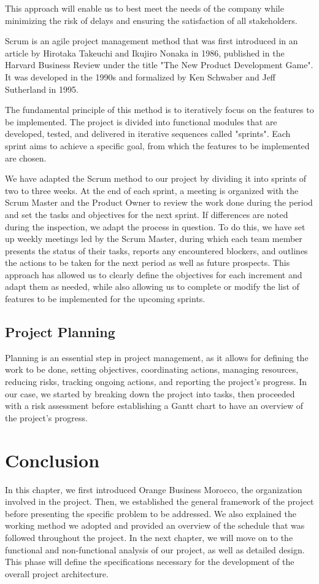 This approach will enable us to best meet the needs of the company while minimizing the risk of delays and ensuring the satisfaction of all stakeholders.

Scrum is an agile project management method that was first introduced in an article by Hirotaka Takeuchi and Ikujiro Nonaka in 1986, published in the Harvard Business Review under the title "The New Product Development Game". It was developed in the 1990s and formalized by Ken Schwaber and Jeff Sutherland in 1995.

The fundamental principle of this method is to iteratively focus on the features to be implemented. The project is divided into functional modules that are developed, tested, and delivered in iterative sequences called "sprints". Each sprint aims to achieve a specific goal, from which the features to be implemented are chosen.

We have adapted the Scrum method to our project by dividing it into sprints of two to three weeks. At the end of each sprint, a meeting is organized with the Scrum Master and the Product Owner to review the work done during the period and set the tasks and objectives for the next sprint. If differences are noted during the inspection, we adapt the process in question. To do this, we have set up weekly meetings led by the Scrum Master, during which each team member presents the status of their tasks, reports any encountered blockers, and outlines the actions to be taken for the next period as well as future prospects. This approach has allowed us to clearly define the objectives for each increment and adapt them as needed, while also allowing us to complete or modify the list of features to be implemented for the upcoming sprints.

\subsection{Project Planning}
Planning is an essential step in project management, as it allows for defining the work to be done, setting objectives, coordinating actions, managing resources, reducing risks, tracking ongoing actions, and reporting the project's progress. In our case, we started by breaking down the project into tasks, then proceeded with a risk assessment before establishing a Gantt chart to have an overview of the project's progress.

\section{Conclusion}
In this chapter, we first introduced Orange Business Morocco, the organization involved in the project. Then, we established the general framework of the project before presenting the specific problem to be addressed. We also explained the working method we adopted and provided an overview of the schedule that was followed throughout the project. In the next chapter, we will move on to the functional and non-functional analysis of our project, as well as detailed design. This phase will define the specifications necessary for the development of the overall project architecture.